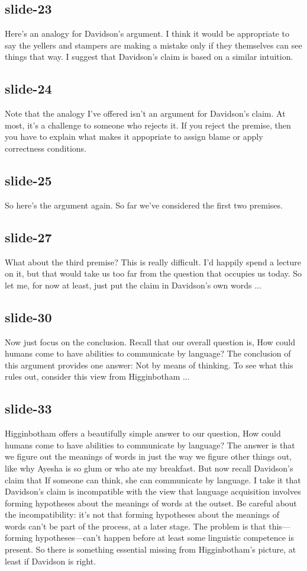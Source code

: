 \documentclass[12pt,\papersize]{extarticle}
\begin{document}
 
\subsection{slide-23}
Here's an analogy for Davidson's argument.
I think it would be appropriate to say the yellers and stampers are making a mistake only if they themselves can see things that way.
I suggest that Davidson's claim is based on a similar intuition.
 
 
\subsection{slide-24}
Note that the analogy I've offered isn't an argument for Davidson's claim.
At most, it's a challenge to someone who rejects it.
If you reject the premise, then you have to explain what makes it appopriate to assign blame or apply correctness conditions.
 
 
\subsection{slide-25}
So here's the argument again.
So far we've considered the first two premises.
 
 
\subsection{slide-27}
What about the third premise?
This is really difficult.
I'd happily spend a lecture on it, but that would take us too far from the question that occupies us today.
So let me, for now at least, just put the claim in Davidson's own words ...
 
 
\subsection{slide-30}
Now just focus on the conclusion.
Recall that our overall question is, How could humans come to have abilities to communicate by language?
The conclusion of this argument provides one answer: Not by means of thinking.
To see what this rules out, consider this view from Higginbotham ...
 
 
\subsection{slide-33}
Higginbotham offers a beautifully simple answer to our question, How could humans come to have abilities to communicate by language?
The answer is that we figure out the meanings of words in just the way we figure other things out, like why Ayesha is so glum or who ate my breakfast.
But now recall Davidson's claim that If someone can think, she can communicate by language.
I take it that Davidson's claim is incompatible with the view that language acquisition involves forming hypotheses about the meanings of words at the outset.
Be careful about the incompatibility: it's not that forming hypotheses about the meanings of words can't be part of the process, at a later stage.
The problem is that this---forming hypotheses---can't happen before at least some linguistic competence is present.
So there is something essential missing from Higginbotham's picture, at least if Davidson is right.
 
\end{document}

